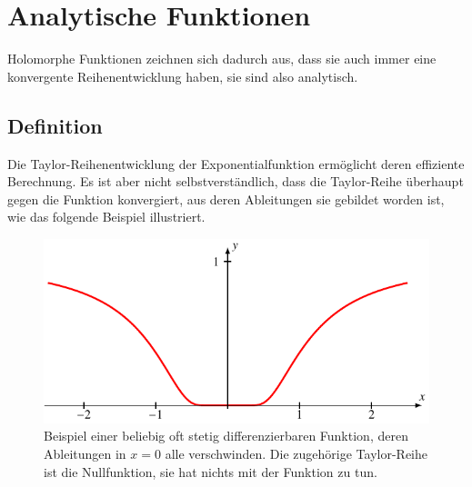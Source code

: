 %
%
%
\section{Analytische Funktionen
\label{buch:funktionentheorie:section:analytisch}}
Holomorphe Funktionen zeichnen sich dadurch aus, dass sie auch immer
eine konvergente Reihenentwicklung haben, sie sind also analytisch.

\subsection{Definition}
%
%
Die Taylor-Reihenentwicklung der Exponentialfunktion ermöglicht deren
effiziente Berechnung.
Es ist aber nicht selbstverständlich, dass die Taylor-Reihe überhaupt
gegen die Funktion konvergiert, aus deren Ableitungen sie gebildet
worden ist, wie das folgende Beispiel illustriert.

\begin{figure}
\centering
\includegraphics{chapters/080-funktionentheorie/images/nonanalytic.pdf}
\caption{Beispiel einer beliebig oft stetig differenzierbaren Funktion,
deren Ableitungen in $x=0$ alle verschwinden.
Die zugehörige Taylor-Reihe ist die Nullfunktion, sie hat nichts mit der
Funktion zu tun.
\label{buch:funktionentheorie:fig:nonanalytic}}
\end{figure}

